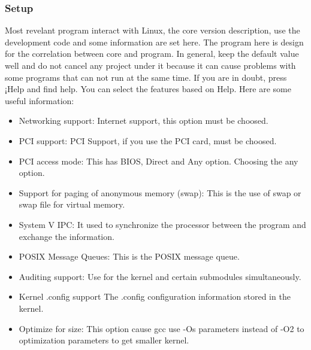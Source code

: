 \documentclass[10pt,draftclsnofoot,peerreview ,letterpaper,onecolumn,]{IEEEtran}
\begin{document}
	\subsubsection{Setup}
	Most revelant program interact with Linux, the core version description, use the development code and some information are set here. The program here is design for the correlation between core and program. In general, keep the default value well and do not cancel any project under it because it can cause problems with some programs that can not run at the same time. If you are in doubt, press ¡Help and find help. You can select the features based on Help. Here are some useful information:
	\begin{itemize}
		\item Networking support: Internet support, this option must be choosed. \\
		\item PCI support: PCI Support, if you use the PCI card, must be choosed.\\
		\item PCI access mode:  This has BIOS, Direct and Any option. Choosing the any option. \\
		\item Support for paging of anonymous memory (swap): This is the use of swap or swap file for virtual memory. \\
		\item System V IPC: It used to synchronize the processor between the program and exchange the information. \\
		\item POSIX Message Queues: This is the POSIX message queue.\\
		\item Auditing support: Use for the kernel and certain submodules simultaneously. \\
		\item Kernel .config support The .config configuration information stored in the kernel. \\
		\item Optimize for size: This option cause gcc use -Os parameters instead of -O2 to optimization parameters to get smaller kernel. \\
	\end{itemize}
	
\end{document}
